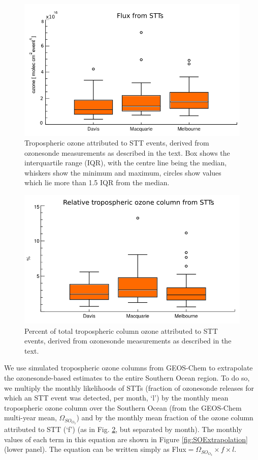 \documentclass{article}
\begin{document}
  \begin{figure}[!htbp]
    \begin{center}
    \includegraphics[width=0.8\columnwidth]{figures/flux_absolute.png}
    \caption{Tropospheric ozone attributed to STT events, derived from ozonesonde measurements as described in the text.
      Box shows the interquartile range (IQR), with the centre line being the median, whiskers show the minimum and maximum, circles show values which lie more than 1.5 IQR from the median.}
    \label{fig:fluxsummaryabs}
    \end{center}
  \end{figure}
  \begin{figure}[!htbp]
    \begin{center}
    \includegraphics[width=0.8\columnwidth]{figures/flux_relative.png}
    \caption{Percent of total tropospheric column ozone attributed to STT events, derived from ozonesonde measurements as described in the text.}
    \label{fig:fluxsummary}
    \end{center}
  \end{figure}
  
  We use simulated tropospheric ozone columns from GEOS-Chem to extrapolate the ozonesonde-based estimates to the entire Southern Ocean region. 
  To do so, we multiply the monthly likelihoods of STTs (fraction of ozonesonde releases for which an STT event was detected, per month, `l') by the monthly mean tropospheric ozone column over the Southern Ocean (from the GEOS-Chem multi-year mean, $\Omega_{SO_{O_3}}$) and by the monthly mean fraction of the ozone column attributed to STT (`f') (as in Fig. \ref{fig:fluxsummary}, but separated by month).
  The monthly values of each term in this equation are shown in Figure \ref{fig:SOExtrapolation} (lower panel).
  The equation can be written simply as Flux$= \Omega_{SO_{O_3}} \times f \times l$.
\end{document}
